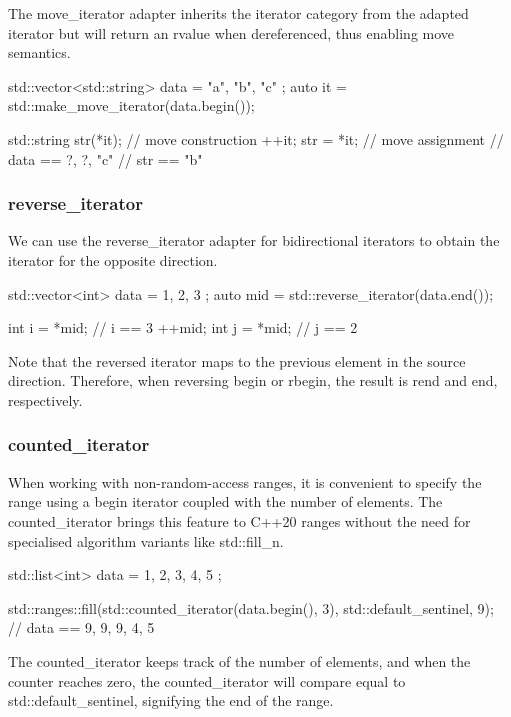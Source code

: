 The move\_iterator adapter inherits the iterator category from the adapted iterator but will return an rvalue when dereferenced, thus enabling move semantics.

\begin{box-note}
\begin{cppcode}
std::vector<std::string> data = { "a", "b", "c" };
auto it = std::make_move_iterator(data.begin());

std::string str(*it); // move construction
++it;
str = *it; // move assignment
// data == { ?, ?, "c" }
// str == "b"
\end{cppcode}
\end{box-note}

\subsubsection{reverse\_iterator}

We can use the reverse\_iterator adapter for bidirectional iterators to obtain the iterator for the opposite direction.

\begin{box-note}
\begin{cppcode}
std::vector<int> data = { 1, 2, 3 };
auto mid = std::reverse_iterator(data.end());

int i = *mid; // i == 3
++mid;
int j = *mid; // j == 2
\end{cppcode}
\end{box-note}

Note that the reversed iterator maps to the previous element in the source direction. Therefore, when reversing begin or rbegin, the result is rend and end, respectively.

\subsubsection{counted\_iterator}

When working with non-random-access ranges, it is convenient to specify the range using a begin iterator coupled with the number of elements. The counted\_iterator brings this feature to C++20 ranges without the need for specialised algorithm variants like std::fill\_n.

\begin{box-note}
\begin{cppcode}
std::list<int> data = { 1, 2, 3, 4, 5 };

std::ranges::fill(std::counted_iterator(data.begin(), 3), std::default_sentinel, 9);
// data == { 9, 9, 9, 4, 5 }
\end{cppcode}
\end{box-note}

The counted\_iterator keeps track of the number of elements, and when the counter reaches zero, the counted\_iterator will compare equal to std::default\_sentinel, signifying the end of the range.